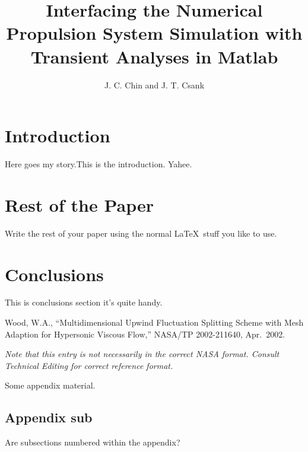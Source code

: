 \documentclass[]             %
{NASA}                       %
\title{Interfacing the Numerical Propulsion System Simulation with Transient Analyses in Matlab}
\author{J. C. Chin and J. T. Csank} %
\begin{document}

\section{Introduction}
Here goes my story.This is the introduction.
Yahee.

\section{Rest of the Paper}
Write the rest of your paper using the normal \LaTeX\ stuff you like to
use.

\section{Conclusions}
This is conclusions section it's quite handy.

\begin{thebibliography}{WoodTP}
 Wood, W.A., ``Multidimensional Upwind
  Fluctuation Splitting Scheme with Mesh Adaption for Hypersonic Viscous
  Flow,'' NASA/TP 2002-211640, Apr.~2002.
\end{thebibliography}
{\em Note that this entry is not necessarily in the correct NASA
  format. Consult Technical Editing for correct reference format.}

\newpage
\appendix

Some appendix material.

\subsection{Appendix sub}
Are subsections numbered within the appendix?

\end{document}
